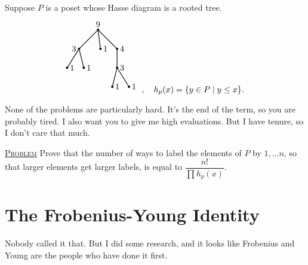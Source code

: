\documentclass{report}
\newcommand{\fancyem}[1]{\underline{\textsc{#1}}}
\theoremstyle{definition}
\theoremstyle{remark}
\numberwithin{equation}{section}
\begin{document}
Suppose $P$ is a poset whose Hasse diagram is a rooted tree.
\[
    \begin{tikzpicture}
        \node[shape=circle, fill=black, scale = 0.3] (A1) at (0, 0) {};
        \node[above] at (A1) {9};
        \node[shape=circle, fill=black, scale = 0.3] (A2) at (-0.8, -0.8) {};
        \node[left] at (A2) {3};
        \node[shape=circle, fill=black, scale = 0.3] (A3) at (0.1, -0.8) {};
        \node[right] at (A3) {1};
        \node[shape=circle, fill=black, scale = 0.3] (A4) at (0.8, -0.8) {};
        \node[right] at (A4) {4};

        \node[shape=circle, fill=black, scale = 0.3] (A5) at (-1.3, -1.6) {};
        \node[right] at (A5) {1};
        \node[shape=circle, fill=black, scale = 0.3] (A6) at (-0.6, -1.6) {};
        \node[right] at (A6) {1};

        \node[shape=circle, fill=black, scale = 0.3] (A7) at (0.8, -1.6) {};
        \node[right] at (A7) {3};

        \node[shape=circle, fill=black, scale = 0.3] (A8) at (1.3, -2.4) {};
        \node[right] at (A8) {1};
        \node[shape=circle, fill=black, scale = 0.3] (A9) at (0.6, -2.4) {};
        \node[right] at (A9) {1};

        \draw[thick] (A3) to (A1) to (A2);
        \draw[thick] (A5) to (A2) to (A6);
        \draw[thick] (A1) to (A4) to (A7);
        \draw[thick] (A8) to (A7) to (A9);
    \end{tikzpicture}\ , \quad h_p(x) = \{y \in P \mid y \leq x\}.
\]

\epigraph{None of the problems are particularly hard. It's the end of the term, so you are probably tired. I also want you to give me high evaluations. But I have tenure, so I don't care that much.}{}

\fancyem{Problem} Prove that the number of ways to label the elements of $P$ by $1, \ldots n$, so that larger elements get larger labels, is equal to $\dfrac{n!}{\prod h_p(x)}$.

\section{The Frobenius-Young Identity}
\epigraph{Nobody called it that. But I did some research, and it looks like Frobenius and Young are the people who have done it first.}{}
\end{document}
